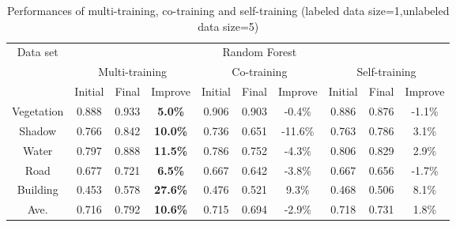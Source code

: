 \documentclass{article}
\begin{document}
\begin{table}
\begin{center}
\begin{tabular}{c|ccc|ccc|ccc}
\toprule
\multirow{3}{*}{Data set} & \multicolumn{9}{c}{Random Forest}                                  \\
\cline{2-10}
                     & \multicolumn{3}{c|}{Multi-training}  & \multicolumn{3}{c|}{Co-training}   & \multicolumn{3}{c}{Self-training}\\
\cline{2-10}
                     & Initial & Final & Improve            & Initial & Final & Improve          & Initial   & Final   & Improve  \\
\midrule
Vegetation           & 0.888    & 0.933  & \textbf{5.0\%}   & 0.906    & 0.903  & -0.4\%         & 0.886     & 0.876    & -1.1\%   \\
Shadow               & 0.766    & 0.842  & \textbf{10.0\%}  & 0.736    & 0.651  & -11.6\%        & 0.763     & 0.786    & 3.1\%   \\
Water                & 0.797    & 0.888  & \textbf{11.5\%}  & 0.786    & 0.752  & -4.3\%         & 0.806     & 0.829    & 2.9\%   \\
Road                 & 0.677    & 0.721  & \textbf{6.5\%}   & 0.667    & 0.642  & -3.8\%         & 0.667     & 0.656    & -1.7\%   \\
Building             & 0.453    & 0.578  & \textbf{27.6\%}  & 0.476    & 0.521  & 9.3\%          & 0.468     & 0.506    & 8.1\%   \\
\midrule
Ave.                 & 0.716    & 0.792  & \textbf{10.6\%}  & 0.715    & 0.694  & -2.9\%         & 0.718     & 0.731    & 1.8\%   \\
\bottomrule
\end{tabular}
\caption{Performances of multi-training, co-training and self-training (labeled data size=1,unlabeled data size=5)}
\end{center}
\end{table}
\end{document}
